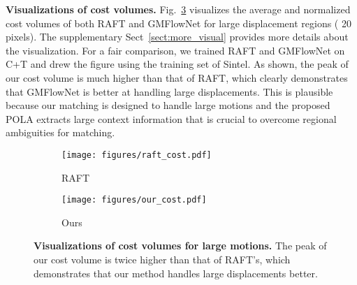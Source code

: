 \documentclass[10pt,twocolumn,letterpaper]{article}
\begin{document}
{\bf Visualizations of cost volumes.} Fig.~\ref{fig:cost_comp} visualizes the average and normalized cost volumes of both RAFT and GMFlowNet for large displacement regions ( 20 pixels). The supplementary Sect~\ref{sect:more_visual} provides more details about the visualization. 
For a fair comparison, we trained RAFT and GMFlowNet on C+T and drew the figure using the training set of Sintel. 
As shown, the peak of our cost volume is much higher than that of RAFT, which clearly demonstrates that GMFlowNet is better at handling large displacements. 
This is plausible because our matching is designed to handle large motions and the proposed POLA extracts large context information that is crucial to overcome regional ambiguities for matching.

\begin{figure}[t]
  \centering
  \begin{subfigure}{0.49\linewidth}
    \centering
        \texttt{[image: figures/raft\_cost.pdf]}
    \caption{RAFT\cite{teed2020raft}}
    \label{fig:cost_comp_raft}
  \end{subfigure}
  \begin{subfigure}{0.49\linewidth}
    \centering
        \texttt{[image: figures/our\_cost.pdf]}
    \caption{Ours}
    \label{fig:cost_comp_ours}
  \end{subfigure}
  \caption{\textbf{Visualizations of cost volumes for large motions.} 
  The peak of our cost volume is twice higher than that of RAFT's, which demonstrates that our method handles large displacements better.
  }
  \label{fig:cost_comp}
\end{figure}
\end{document}
